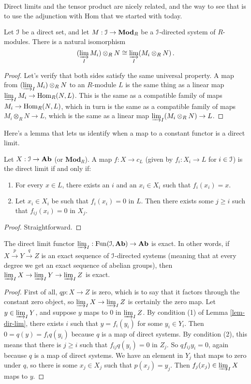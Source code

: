 Direct limits and the tensor product are nicely related, and the way to see
that is to use the adjunction with Hom that we started with today.

\begin{prop}
Let $\mathcal I$ be a direct set, and let $M:\mathcal I\to\mathbf{Mod}_R$ be a $\mathcal I$-directed system of $R$-modules. There is a natural isomorphism 
\[
(\varinjlim_I M_i)\otimes_R N\cong \varinjlim_I (M_i\otimes_R N)\,.
\]
\end{prop}
\begin{proof}
Let's verify that both sides satisfy the same universal property. 
A map from $(\varinjlim_I M_i)\otimes_R N$ to an $R$-module $L$ is the same
thing as a linear map $\varinjlim_IM_i\to\operatorname{Hom}_R(N,L)$. This is the same as
a compatible family of maps $M_i\to\operatorname{Hom}_R(N,L)$, which in turn is the same
as a compatible family of maps $M_i\otimes_RN\to L$, which is the same as
a linear map $\varinjlim_I(M_i\otimes_RN)\to L$. 
\end{proof}

Here's a lemma that lets us identify when a map to a constant functor is a
direct limit.
\begin{lemma}
\label{lem-dir-lim}
Let $X:\mathcal I\to\mathbf{Ab}$ (or $\mathbf{Mod}_R$). A map $f:X\to c_L$ (given
by $f_i:X_i\to L$ for $i\in\mathcal I$) is the direct limit if and only if:
\begin{enumerate}
\item For every $x\in L$, there exists an $i$ and an $x_i\in X_i$ such that $f_i(x_i)=x$.
\item Let $x_i\in X_i$ be such that $f_i(x_i)=0$ in $L$. Then there exists some $j\geq i$ such that $f_{ij}(x_i)=0$ in $X_j$.
\end{enumerate}
\end{lemma}
\begin{proof}
Straightforward.
\end{proof}
\begin{prop}
The direct limit functor $\varinjlim_I:\operatorname{Fun}(\mathcal I,\mathbf{Ab})\to\mathbf{Ab}$ is exact. In other words, if $X\xrightarrow{p}Y\xrightarrow{q}Z$ is an exact sequence of $\mathcal I$-directed systems (meaning that at every degree we get an exact sequence of abelian groups), then $\varinjlim_IX\rightarrow \varinjlim_IY\rightarrow\varinjlim_IZ$ is exact.
\end{prop}
\begin{proof}
First of all, $qp:X\to Z$ is zero, which is to say that it factors through the constant zero object, so $\varinjlim_IX\to \varinjlim_I Z$ is certainly the zero map. Let $y\in \varinjlim_IY$, and suppose $y$ maps to $0$ in $\varinjlim_IZ$. By condition (1) of Lemma \ref{lem-dir-lim}, there exists $i$ such that $y=f_i(y_i)$ for some $y_i\in Y_i$. Then $0=q(y)=f_iq(y_i)$ because $q$ is a map of direct systems. By condition (2), this means that there is $j\geq i$ such that $f_{ij}q(y_i)=0$ in $Z_j$. So $qf_{ij}y_i=0$,
again because $q$ is a map of direct systems. We have an element in $Y_j$ that maps to zero under $q$, so there is some $x_j\in X_j$ such that $p(x_j)=y_j$.
Then $f_j(x_j)\in \varinjlim_IX$ maps to $y$.
\end{proof}

